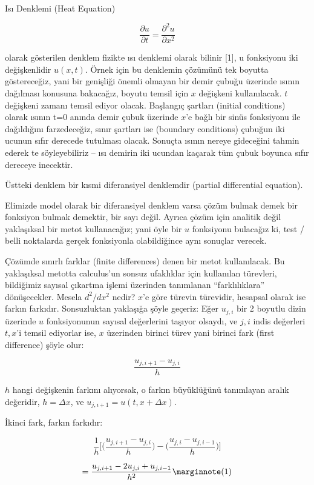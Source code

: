 \documentclass[12pt,fleqn]{article}\usepackage{../../common}
\begin{document}
Isı Denklemi (Heat Equation)

$$ \frac{\partial u}{\partial t} = \frac{\partial^2u}{\partial x^2} $$

olarak gösterilen denklem fizikte ısı denklemi olarak bilinir [1], u fonksiyonu
iki değişkenlidir $u(x,t)$. Örnek için bu denklemin çözümünü tek boyutta
göstereceğiz, yani bir genişliği önemli olmayan bir demir çubuğu üzerinde ısının
dağılması konusuna bakacağız, boyutu temsil için $x$ değişkeni kullanılacak. $t$
değişkeni zamanı temsil ediyor olacak. Başlangıç şartları (initial conditions)
olarak ısının t=0 anında demir çubuk üzerinde $x$'e bağlı bir sinüs fonksiyonu
ile dağıldığını farzedeceğiz, sınır şartları ise (boundary conditions) çubuğun
iki ucunun sıfır derecede tutulması olacak. Sonuçta ısının nereye gideceğini
tahmin ederek te söyleyebiliriz -- ısı demirin iki ucundan kaçarak tüm çubuk
boyunca sıfır dereceye inecektir.

Üstteki denklem bir kısmi diferansiyel denklemdir (partial differential 
equation).

Elimizde model olarak bir diferansiyel denklem varsa çözüm bulmak demek bir
fonksiyon bulmak demektir, bir sayı değil. Ayrıca çözüm için analitik değil
yaklaşıksal bir metot kullanacağız; yani öyle bir $u$ fonksiyonu bulacağız ki,
test / belli noktalarda gerçek fonksiyonla olabildiğince aynı sonuçlar verecek.

Çözümde sınırlı farklar (finite differences) denen bir metot kullanılacak. Bu
yaklaşıksal metotta calculus'un sonsuz ufaklıklar için kullanılan türevleri,
bildiğimiz sayısal çıkartma işlemi üzerinden tanımlanan ``farklılıklara''
dönüşecekler. Mesela $d^2/dx^2$ nedir? $x$'e göre türevin türevidir, hesapsal
olarak ise farkın farkıdır. Sonsuzluktan yaklaşığa şöyle geçeriz: Eğer $u_{j,i}$
bir 2 boyutlu dizin üzerinde $u$ fonksiyonunun sayısal değerlerini taşıyor
olsaydı, ve $j, i$ indis değerleri $t, x$'i temsil ediyorlar ise, $x$ üzerinden
birinci türev yani birinci fark (first difference) şöyle olur:

$$ \frac{u_{j,i+1}-u_{j,i}}{h} $$

$h$ hangi değişkenin farkını alıyorsak, o farkın büyüklüğünü
tanımlayan aralık değeridir, $h=\Delta x$, ve $u_{j,ı+1} = u(t,x +
\Delta x)$.

İkinci fark, farkın farkıdır:

$$
\frac{1}{h}
\bigg[
\bigg( \frac{u_{j,i+1}-u_{j,i}}{h} \bigg) -
\bigg( \frac{u_{j,i}-u_{j,i-1}}{h} \bigg)
\bigg] 
$$

$$
= \frac{u_{j,i+1}-2u_{j,i}+u_{j,i-1}}{h^2} 
\mlabel{1}
$$
\end{document}
